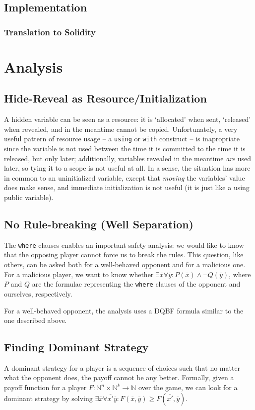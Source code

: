 \documentclass[acmsmall,review,anonymous]{acmart}\settopmatter{printfolios=true,printccs=false,printacmref=false}
\begin{document}
\subsection{Implementation}
\subsubsection{Translation to Solidity}


\section{Analysis}

\subsection{Hide-Reveal as Resource/Initialization}
A hidden variable can be seen as a resource: it is `allocated' when sent, `released' when revealed, and in the meantime cannot be copied. Unfortunately, a very useful pattern of resource usage -- a \texttt{using} or \texttt{with} construct -- is inapropriate since the variable is not used between the time it is committed to the time it is released, but only later; additionally, variables revealed in the meantime \textit{are} used later, so tying it to a scope is not useful at all. In a sense, the situation has more in common to an uninitialized variable, except that \textit{moving} the variables' value does make sense, and immediate initialization is not useful (it is just like a using public variable).

\subsection{No Rule-breaking (Well Separation)}
The \texttt{where} clauses enables an important safety analysis: we would like to know that the opposing player cannot force us to break the rules. This question, like others, can be asked both for a well-behaved opponent and for a malicious one. For a malicious player, we want to know whether $\exists \overline{x} \forall \overline{y}: P(\overline{x})\wedge \neg Q(\overline{y})$, where $P$ and $Q$ are the formulae representing the \texttt{where} clauses of the opponent and ourselves, respectively.

For a well-behaved opponent, the analysis uses a DQBF formula similar to the one described above.

\subsection{Finding Dominant Strategy}
A dominant strategy for a player is a sequence of choices such that no matter what the opponent does, the payoff cannot be any better. Formally, given a payoff function for a player 
$F : \mathbb{N}^n \times \mathbb{N}^k \rightarrow \mathbb{N}$ 
over the game, we can look for a dominant strategy by solving
$\exists \overline{x} \forall \overline{x'} \overline{y}: F(\overline{x}, \overline{y})\geq F(\overline{x'}, \overline{y})$.
\end{document}
